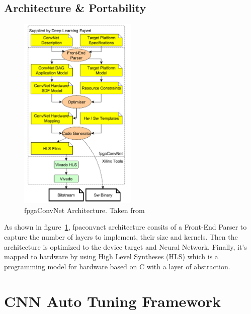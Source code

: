 \subsection{Architecture \& Portability}

\begin{figure}[!htbp]
    \centering
    \includegraphics[width=0.5\textwidth]{Figures/fpgaconvnet.png}
    \caption{fpgaConvNet Architecture. Taken from~\cite{fpgaconvnet}}
    \label{figure:fpgaconvnet}
\end{figure}

As shown in figure~\ref{figure:fpgaconvnet}, fpaconvnet architecture consits of a Front-End Parser to capture
the number of layers to implement, their size and kernels. Then the architecture is optimized to the device target and Neural Network.
Finally, it's mapped to hardware by using High Level Syntheses (HLS) which is a programming model for hardware based on C with a layer of abstraction.
\newpage
\section{CNN Auto Tuning Framework}
\label{section:autotuning}
